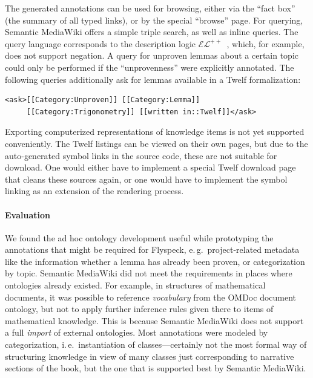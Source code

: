 The generated annotations can be used for browsing, either via the
``fact box'' (the summary of all typed links), or by the special ``browse''
page.  For querying, Semantic MediaWiki offers a simple triple search, as well
as inline queries.  The query language corresponds to the description logic
$\mathcal{EL}^{++}$~\cite{KrSchVr:semwiki-reasoning07}, which, for example, does
not support negation.  A query for unproven lemmas about a certain topic could
only be performed if the ``unprovenness'' were explicitly annotated.  The
following queries additionally ask for lemmas available in a Twelf formalization:

\begin{lstlisting}
<ask>[[Category:Unproven]] [[Category:Lemma]]
     [[Category:Trigonometry]] [[written in::Twelf]]</ask>
\end{lstlisting}

Exporting computerized representations of knowledge items is not yet supported
conveniently.  The Twelf listings can be viewed on their own pages, but due to
the auto-generated symbol links in the source code, these are not suitable for
download.  One would either have to implement a special Twelf download page that
cleans these sources again, or one would have to implement the symbol linking as
an extension of the rendering process.

\paragraph{Evaluation} We found the ad hoc ontology development useful while
prototyping the annotations that might be required for Flyspeck, e.\,g.\
project-related metadata like the information whether a lemma has already been
proven, or categorization by topic.  Semantic MediaWiki did not meet the
requirements in places where ontologies already existed.  For example, in
structures of mathematical documents, it was possible to reference
\emph{vocabulary} from the OMDoc document ontology, but not to apply further
inference rules given there to items of mathematical knowledge.  This is because
Semantic MediaWiki does not support a full \emph{import} of external ontologies.
Most annotations were modeled by categorization, i.\,e.\ instantiation of
classes---certainly not the most formal way of structuring knowledge in view of
many classes just corresponding to narrative sections of the book, but the one
that is supported best by Semantic MediaWiki.

